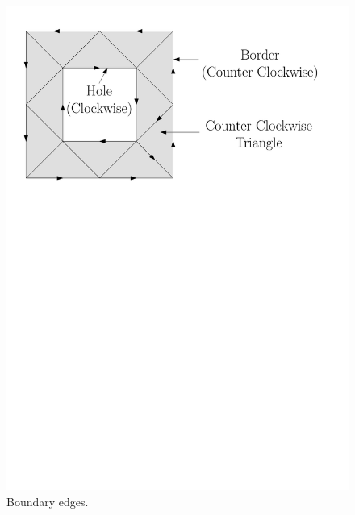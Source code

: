 \begin{figure}[t]
    \centering
    \includegraphics[width=5in]{border}
    \caption[Boundary edges]{Boundary edges.}
    \label{fig:Ch1-border}
\end{figure}